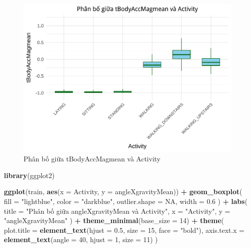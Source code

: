 \documentclass[
]{article}
\newenvironment{Shaded}{\begin{snugshade}}{\end{snugshade}}
\newcommand{\AttributeTok}[1]{\textcolor[rgb]{0.13,0.29,0.53}{#1}}
\newcommand{\ConstantTok}[1]{\textcolor[rgb]{0.56,0.35,0.01}{#1}}
\newcommand{\DecValTok}[1]{\textcolor[rgb]{0.00,0.00,0.81}{#1}}
\newcommand{\FloatTok}[1]{\textcolor[rgb]{0.00,0.00,0.81}{#1}}
\newcommand{\FunctionTok}[1]{\textcolor[rgb]{0.13,0.29,0.53}{\textbf{#1}}}
\newcommand{\NormalTok}[1]{#1}
\newcommand{\SpecialCharTok}[1]{\textcolor[rgb]{0.81,0.36,0.00}{\textbf{#1}}}
\newcommand{\StringTok}[1]{\textcolor[rgb]{0.31,0.60,0.02}{#1}}
\begin{document}
\begin{figure}
\centering
\includegraphics{report_files/figure-latex/unnamed-chunk-16-1.pdf}
\caption{Phân bố giữa tBodyAccMagmean và Activity}
\end{figure}

\begin{Shaded}
\begin{Highlighting}[]
\FunctionTok{library}\NormalTok{(ggplot2)}

\FunctionTok{ggplot}\NormalTok{(train, }\FunctionTok{aes}\NormalTok{(}\AttributeTok{x =}\NormalTok{ Activity, }\AttributeTok{y =}\NormalTok{ angleXgravityMean)) }\SpecialCharTok{+}
  \FunctionTok{geom\_boxplot}\NormalTok{(}
    \AttributeTok{fill =} \StringTok{"lightblue"}\NormalTok{,}
    \AttributeTok{color =} \StringTok{"darkblue"}\NormalTok{,}
    \AttributeTok{outlier.shape =} \ConstantTok{NA}\NormalTok{,}
    \AttributeTok{width =} \FloatTok{0.6}
\NormalTok{  ) }\SpecialCharTok{+}
  \FunctionTok{labs}\NormalTok{(}
    \AttributeTok{title =} \StringTok{"Phân bố giữa angleXgravityMean và Activity"}\NormalTok{,}
    \AttributeTok{x =} \StringTok{"Activity"}\NormalTok{,}
    \AttributeTok{y =} \StringTok{"angleXgravityMean"}
\NormalTok{  ) }\SpecialCharTok{+}
  \FunctionTok{theme\_minimal}\NormalTok{(}\AttributeTok{base\_size =} \DecValTok{14}\NormalTok{) }\SpecialCharTok{+}
  \FunctionTok{theme}\NormalTok{(}
    \AttributeTok{plot.title =} \FunctionTok{element\_text}\NormalTok{(}\AttributeTok{hjust =} \FloatTok{0.5}\NormalTok{, }\AttributeTok{size =} \DecValTok{15}\NormalTok{, }\AttributeTok{face =} \StringTok{"bold"}\NormalTok{),}
    \AttributeTok{axis.text.x =} \FunctionTok{element\_text}\NormalTok{(}\AttributeTok{angle =} \DecValTok{40}\NormalTok{, }\AttributeTok{hjust =} \DecValTok{1}\NormalTok{, }\AttributeTok{size =} \DecValTok{11}\NormalTok{)}
\NormalTok{  )}
\end{Highlighting}
\end{Shaded}
\end{document}
